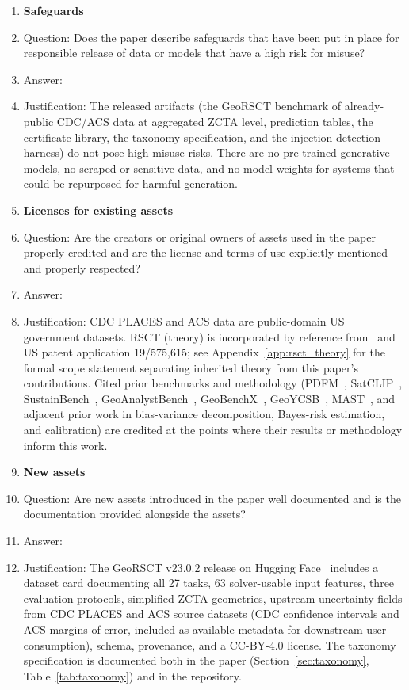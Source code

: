 \documentclass{article}
\begin{document}
\begin{enumerate}
\item {\bf Safeguards}
    \item[] Question: Does the paper describe safeguards that have been put in place for responsible release of data or models that have a high risk for misuse?
    \item[] Answer: \answerNA{}
    \item[] Justification: The released artifacts (the GeoRSCT benchmark of already-public CDC/ACS data at aggregated ZCTA level, prediction tables, the certificate library, the taxonomy specification, and the injection-detection harness) do not pose high misuse risks. There are no pre-trained generative models, no scraped or sensitive data, and no model weights for systems that could be repurposed for harmful generation.

\item {\bf Licenses for existing assets}
    \item[] Question: Are the creators or original owners of assets used in the paper properly credited and are the license and terms of use explicitly mentioned and properly respected?
    \item[] Answer: \answerYes{}
    \item[] Justification: CDC PLACES and ACS data are public-domain US government datasets. RSCT (theory) is incorporated by reference from~\citep{martin2026rsct} and US patent application 19/575,615; see Appendix~\ref{app:rsct_theory} for the formal scope statement separating inherited theory from this paper's contributions. Cited prior benchmarks and methodology (PDFM~\citep{agarwal2025pdfm}, SatCLIP~\citep{klemmer2023satclip}, SustainBench~\citep{yeh2021sustainbench}, GeoAnalystBench~\citep{zhang2025geoanalyst}, GeoBenchX~\citep{krechetova2025geobenchx}, GeoYCSB~\citep{kim2023geoycsb}, MAST~\citep{cemri2025mast}, and adjacent prior work in bias-variance decomposition, Bayes-risk estimation, and calibration) are credited at the points where their results or methodology inform this work.

\item {\bf New assets}
    \item[] Question: Are new assets introduced in the paper well documented and is the documentation provided alongside the assets?
    \item[] Answer: \answerYes{}
    \item[] Justification: The GeoRSCT v23.0.2 release on Hugging Face~\citep{geocert2026} includes a dataset card documenting all 27 tasks, 63 solver-usable input features, three evaluation protocols, simplified ZCTA geometries, upstream uncertainty fields from CDC PLACES and ACS source datasets (CDC confidence intervals and ACS margins of error, included as available metadata for downstream-user consumption), schema, provenance, and a CC-BY-4.0 license. The taxonomy specification is documented both in the paper (Section~\ref{sec:taxonomy}, Table~\ref{tab:taxonomy}) and in the repository.


\end{enumerate}
\end{document}
